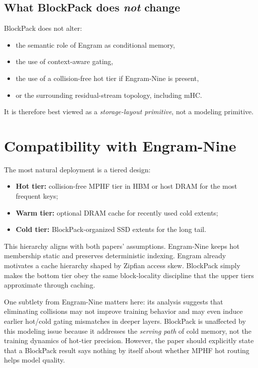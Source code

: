 \documentclass[11pt]{article}
\begin{document}
\subsection{What BlockPack does \emph{not} change}
BlockPack does not alter:
\begin{itemize}[leftmargin=1.5em]
    \item the semantic role of Engram as conditional memory,
    \item the use of context-aware gating,
    \item the use of a collision-free hot tier if Engram-Nine is present,
    \item or the surrounding residual-stream topology, including mHC.
\end{itemize}
It is therefore best viewed as a \emph{storage-layout primitive}, not a modeling primitive.

\section{Compatibility with Engram-Nine}
The most natural deployment is a tiered design:
\begin{itemize}[leftmargin=1.5em]
    \item \textbf{Hot tier:} collision-free MPHF tier in HBM or host DRAM for the most frequent keys;
    \item \textbf{Warm tier:} optional DRAM cache for recently used cold extents;
    \item \textbf{Cold tier:} BlockPack-organized SSD extents for the long tail.
\end{itemize}
This hierarchy aligns with both papers' assumptions. Engram-Nine keeps hot membership static and preserves deterministic indexing. Engram already motivates a cache hierarchy shaped by Zipfian access skew. BlockPack simply makes the bottom tier obey the same block-locality discipline that the upper tiers approximate through caching.

One subtlety from Engram-Nine matters here: its analysis suggests that eliminating collisions may not improve training behavior and may even induce earlier hot/cold gating mismatches in deeper layers. BlockPack is unaffected by this modeling issue because it addresses the \emph{serving path} of cold memory, not the training dynamics of hot-tier precision. However, the paper should explicitly state that a BlockPack result says nothing by itself about whether MPHF hot routing helps model quality.
\end{document}
